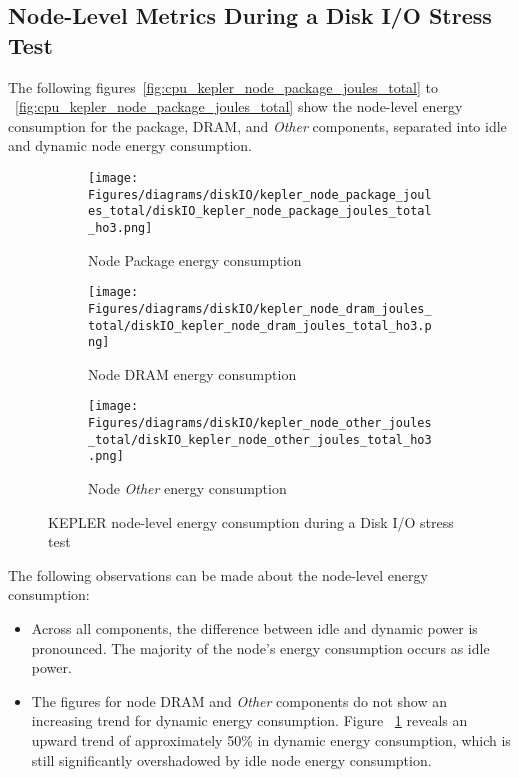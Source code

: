 \subsection{Node-Level Metrics During a Disk I/O Stress Test}

The following figures~\ref{fig:cpu_kepler_node_package_joules_total} to ~\ref{fig:cpu_kepler_node_package_joules_total} show the node-level energy consumption for the package, DRAM, and \textit{Other} components, separated into idle and dynamic node energy consumption.

\begin{figure}[H]
    \centering
    \begin{subfigure}{0.7\textwidth}
        \texttt{[image: Figures/diagrams/diskIO/kepler\_node\_package\_joules\_total/diskIO\_kepler\_node\_package\_joules\_total\_ho3.png]}
        \caption{Node Package energy consumption}
        \label{fig:diskIO_kepler_node_package_joules_total}
    \end{subfigure}
    \begin{subfigure}{0.49\textwidth}
        \texttt{[image: Figures/diagrams/diskIO/kepler\_node\_dram\_joules\_total/diskIO\_kepler\_node\_dram\_joules\_total\_ho3.png]}
        \caption{Node DRAM energy consumption}
        \label{fig:diskIO_kepler_node_dram_joules_total}
    \end{subfigure}
    \begin{subfigure}{0.49\textwidth}
        \texttt{[image: Figures/diagrams/diskIO/kepler\_node\_other\_joules\_total/diskIO\_kepler\_node\_other\_joules\_total\_ho3.png]}
        \caption{Node \textit{Other} energy consumption}
        \label{fig:diskIO_kepler_node_other_joules_total}
    \end{subfigure}
    \caption[Node-Level Energy Consumption]{KEPLER node-level energy consumption during a Disk I/O stress test}
\end{figure}

The following observations can be made about the node-level energy consumption:
\begin{itemize}
    \item Across all components, the difference between idle and dynamic power is pronounced. The majority of the node's energy consumption occurs as idle power.
    \item The figures for node DRAM and \textit{Other} components do not show an increasing trend for dynamic energy consumption. Figure ~\ref{fig:diskIO_kepler_node_package_joules_total} reveals an upward trend of approximately 50\% in dynamic energy consumption, which is still significantly overshadowed by idle node energy consumption.
\end{itemize}

